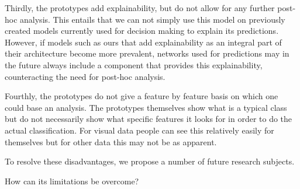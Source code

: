 Thirdly, the prototypes add explainability, but do not allow for any further post-hoc analysis. This entails that we can not simply use this model on previously created models currently used for decision making to explain its predictions. However, if models such as ours that add explainability as an integral part of their architecture become more prevalent, networks used for predictions may in the future always include a component that provides this explainability, counteracting the need for post-hoc analysis.

Fourthly, the prototypes do not give a feature by feature basis on which one could base an analysis. The prototypes themselves show what is a typical class but do not necessarily show what specific features it looks for in order to do the actual classification. For visual data people can see this relatively easily for themselves but for other data this may not be as apparent. 

To resolve these disadvantages, we propose a number of future research subjects. 



How can its limitations be overcome?
